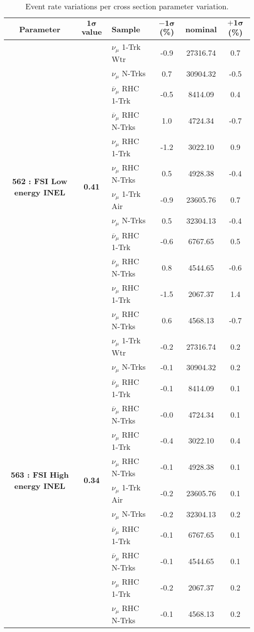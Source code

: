 \begin{table}[ht!]
    \caption[Event Rate Variations Per Cross Section Parameter Variation]{Event rate variations per cross section parameter variation.\label{tab:Nsigma}}
\centering
\begin{tabular}{ c  c  l  c  c  c }
\midrule[1.3pt]
\textbf{Parameter} & \textbf{$\mathbf{1\sigma}$ value} & \textbf{Sample} & \textbf{$\mathbf{-1\sigma}$ (\%)}  &  \textbf{nominal}  &  \textbf{$\mathbf{+1\sigma}$ (\%)} \\
\midrule[1.3pt]
\multirow{12}{*}{\textbf{562 : FSI Low energy INEL}} & \multirow{12}{*}{\textbf{0.41}} & $\nu_\mu$ 1-Trk Wtr &   -0.9 &  27316.74 &   0.7 \\ 
 &  & $\nu_\mu$ N-Trks &   0.7 &  30904.32 &   -0.5 \\ 
 &  & $\overline{\nu}_\mu$ RHC 1-Trk &   -0.5 &  8414.09 &   0.4 \\ 
 &  & $\overline{\nu}_\mu$ RHC N-Trks &   1.0 &  4724.34 &   -0.7 \\ 
 &  & $\nu_\mu$ RHC 1-Trk &   -1.2 &  3022.10 &   0.9 \\ 
 &  & $\nu_\mu$ RHC N-Trks &   0.5 &  4928.38 &   -0.4 \\ 
 &  & $\nu_\mu$ 1-Trk Air &   -0.9 &  23605.76 &   0.7 \\ 
 &  & $\nu_\mu$ N-Trks &   0.5 &  32304.13 &   -0.4 \\ 
 &  & $\overline{\nu}_\mu$ RHC 1-Trk &   -0.6 &  6767.65 &   0.5 \\ 
 &  & $\overline{\nu}_\mu$ RHC N-Trks &   0.8 &  4544.65 &   -0.6 \\ 
 &  & $\nu_\mu$ RHC 1-Trk &   -1.5 &  2067.37 &   1.4 \\ 
 &  & $\nu_\mu$ RHC N-Trks &   0.6 &  4568.13 &   -0.7 \\ 
\midrule[1.3pt]
\multirow{12}{*}{\textbf{563 : FSI High energy INEL}} & \multirow{12}{*}{\textbf{0.34}} & $\nu_\mu$ 1-Trk Wtr &   -0.2 &  27316.74 &   0.2 \\ 
 &  & $\nu_\mu$ N-Trks &   -0.1 &  30904.32 &   0.2 \\ 
 &  & $\overline{\nu}_\mu$ RHC 1-Trk &   -0.1 &  8414.09 &   0.1 \\ 
 &  & $\overline{\nu}_\mu$ RHC N-Trks &   -0.0 &  4724.34 &   0.1 \\ 
 &  & $\nu_\mu$ RHC 1-Trk &   -0.4 &  3022.10 &   0.4 \\ 
 &  & $\nu_\mu$ RHC N-Trks &   -0.1 &  4928.38 &   0.1 \\ 
 &  & $\nu_\mu$ 1-Trk Air &   -0.2 &  23605.76 &   0.1 \\ 
 &  & $\nu_\mu$ N-Trks &   -0.2 &  32304.13 &   0.2 \\ 
 &  & $\overline{\nu}_\mu$ RHC 1-Trk &   -0.1 &  6767.65 &   0.1 \\ 
 &  & $\overline{\nu}_\mu$ RHC N-Trks &   -0.1 &  4544.65 &   0.1 \\ 
 &  & $\nu_\mu$ RHC 1-Trk &   -0.2 &  2067.37 &   0.2 \\ 
 &  & $\nu_\mu$ RHC N-Trks &   -0.1 &  4568.13 &   0.2 \\ 
\midrule[1.3pt]
\end{tabular}
\end{table}
